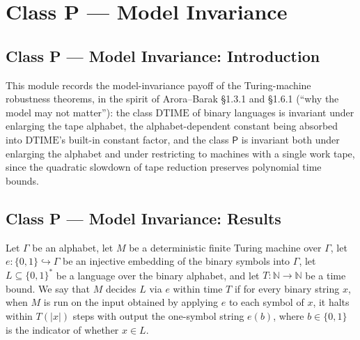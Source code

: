 \section{Class P --- Model Invariance}
\subsection*{Class P --- Model Invariance: Introduction}

This module records the model-invariance payoff of the Turing-machine robustness
theorems, in the spirit of Arora--Barak \S1.3.1 and \S1.6.1 (``why the model may
not matter''): the class $\mathrm{DTIME}$ of binary languages is invariant under
enlarging the tape alphabet, the alphabet-dependent constant being absorbed into
$\mathrm{DTIME}$'s built-in constant factor, and the class $\mathsf{P}$ is
invariant both under enlarging the alphabet and under restricting to machines
with a single work tape, since the quadratic slowdown of tape reduction
preserves polynomial time bounds.

\subsection*{Class P --- Model Invariance: Results}

\begin{definition}
\label{Turing.FinTM.DecidesInTimeVia}
\leanok
{}
Let $\Gamma$ be an alphabet, let $M$ be a deterministic finite Turing machine
over $\Gamma$, let $e : \{0,1\} \hookrightarrow \Gamma$ be an injective
embedding of the binary symbols into $\Gamma$, let $L \subseteq \{0,1\}^{*}$ be
a language over the binary alphabet, and let $T : \mathbb{N} \to \mathbb{N}$ be
a time bound. We say that $M$ decides $L$ via $e$ within time $T$ if for every
binary string $x$, when $M$ is run on the input obtained by applying $e$ to
each symbol of $x$, it halts within $T(|x|)$ steps with output the one-symbol
string $e(b)$, where $b \in \{0,1\}$ is the indicator of whether $x \in L$.
\end{definition}

